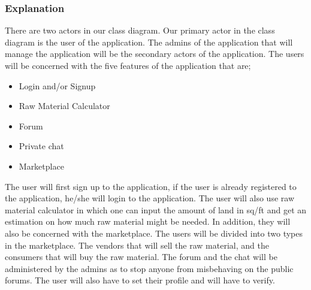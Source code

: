 \documentclass{article}
\begin{document}
\subsubsection*{Explanation}

There are two actors in our class diagram. Our primary actor in the class
diagram is the user of the application. The admins of the application that will
manage the application will be the secondary actors of the application. The
users will be concerned with the five features of the application that are;

\begin{itemize}
      \item Login and/or Signup
      \item Raw Material Calculator
      \item Forum
      \item Private chat
      \item Marketplace
\end{itemize}

The user will first sign up to the application, if the user is already
registered to the application, he/she will login to the application. The user
will also use raw material calculator in which one can input the amount of land
in sq/ft and get an estimation on how much raw material might be needed. In
addition, they will also be concerned with the marketplace. The users will be
divided into two types in the marketplace. The vendors that will sell the raw
material, and the consumers that will buy the raw material. The forum and the
chat will be administered by the admins as to stop anyone from misbehaving on
the public forums. The user will also have to set their profile and will have
to verify.
\end{document}
